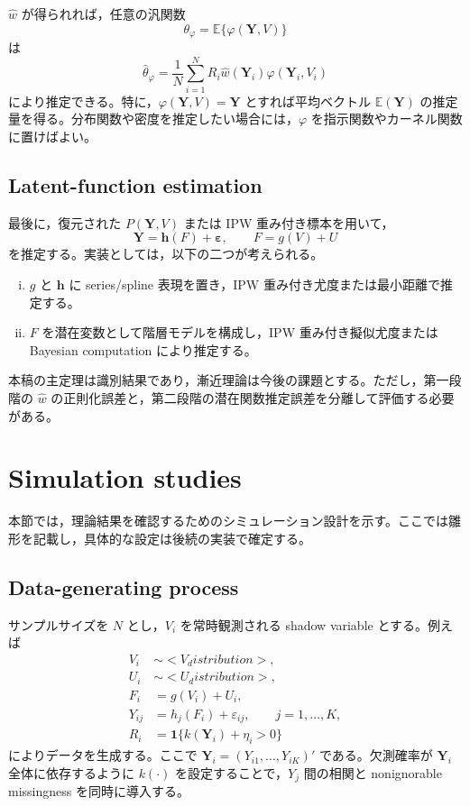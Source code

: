 \documentclass[10pt,a4paper]{article}
\newcommand{\E}{\mathbb{E}}
\newcommand{\1}{\mathbf{1}}
\newcommand{\Y}{\bm{Y}}
\newcommand{\eps}{\bm{\varepsilon}}
\begin{document}
$\widehat w$ が得られれば，任意の汎関数
\begin{equation}
  \theta_\varphi=\E\{\varphi(\Y,V)\}
\end{equation}
は
\begin{equation}
  \widehat\theta_\varphi=\frac{1}{N}\sum_{i=1}^N R_i\widehat w(\Y_i)\varphi(\Y_i,V_i)
  \label{eq:ipw-estimator}
\end{equation}
により推定できる。特に，$\varphi(\Y,V)=\Y$ とすれば平均ベクトル $\E(\Y)$ の推定量を得る。分布関数や密度を推定したい場合には，$\varphi$ を指示関数やカーネル関数に置けばよい。

\subsection{Latent-function estimation}

最後に，復元された $P(\Y,V)$ または IPW 重み付き標本を用いて，
\begin{equation}
  \Y=\bm h(F)+\eps,
  \qquad F=g(V)+U
\end{equation}
を推定する。実装としては，以下の二つが考えられる。
\begin{enumerate}[(i)]
  \item $g$ と $\bm h$ に series/spline 表現を置き，IPW 重み付き尤度または最小距離で推定する。
  \item $F$ を潜在変数として階層モデルを構成し，IPW 重み付き擬似尤度または Bayesian computation により推定する。
\end{enumerate}
本稿の主定理は識別結果であり，漸近理論は今後の課題とする。ただし，第一段階の $\widehat w$ の正則化誤差と，第二段階の潜在関数推定誤差を分離して評価する必要がある。

\section{Simulation studies}

本節では，理論結果を確認するためのシミュレーション設計を示す。ここでは雛形を記載し，具体的な設定は後続の実装で確定する。

\subsection{Data-generating process}

サンプルサイズを $N$ とし，$V_i$ を常時観測される shadow variable とする。例えば
\begin{align}
  V_i &\sim <V_distribution>,\\
  U_i &\sim <U_distribution>,\\
  F_i &= g(V_i)+U_i,\\
  Y_{ij} &= h_j(F_i)+\varepsilon_{ij},\qquad j=1,\ldots,K,\\
  R_i &=\1\{k(\Y_i)+\eta_i>0\}
\end{align}
によりデータを生成する。ここで $\Y_i=(Y_{i1},\ldots,Y_{iK})'$ である。欠測確率が $\Y_i$ 全体に依存するように $k(\cdot)$ を設定することで，$Y_j$ 間の相関と nonignorable missingness を同時に導入する。
\end{document}
